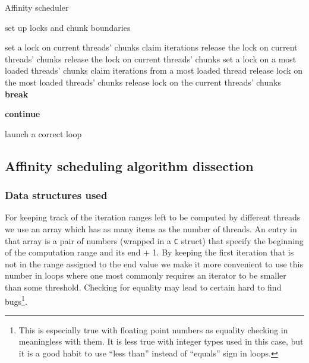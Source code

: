 \documentclass[11pt,a4paper]{article}
\begin{document}
\begin{algorithm}
    \caption{Affinity scheduler}\label{aff_src}
    \begin{algorithmic}[1]
        \State set up locks and chunk boundaries

            \State set a lock on current threads' chunks
                \State claim iterations
                \State release the lock on current threads' chunks
                \State release the lock on current threads' chunks
                \State set a lock on a most loaded threads' chunks
                \State claim iterations from a most loaded thread
                \State release lock on the most loaded threads' chunks
            \Else
                \State release lock on the current threads' chunks
                \State \textbf{break}
            \EndIf

                \State \textbf{continue}
            \EndIf

            \State launch a correct loop
        \EndWhile
    \end{algorithmic}
\end{algorithm}

\subsection{Affinity scheduling algorithm dissection}
\subsubsection{Data structures used}
For keeping track of the iteration ranges left to be computed by different threads we use an array which has as many items as the number of threads. 
An entry in that array is a pair of numbers (wrapped in a \texttt{C} struct) that specify the beginning of the computation range and its end + 1. 
By keeping the first iteration that is not in the range assigned to the end value we make it more convenient to use this number in loops where one most commonly requires an iterator to be smaller than some threshold.
Checking for equality may lead to certain hard to find bugs\footnote{This is especially true with floating point numbers as equality checking in meaningless with them. It is less true with integer types used in this case, but it is a good habit to use ``less than'' instead of ``equals'' sign in loops.}.
\end{document}
